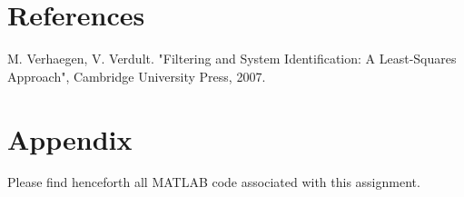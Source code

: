 \documentclass[12pt]{report}
\begin{document}
\newpage
\section*{References}


M. Verhaegen, V. Verdult. "Filtering and System Identification: A Least-Squares Approach", Cambridge University Press, 2007.

\section*{Appendix}
Please find henceforth all MATLAB code associated with this assignment.
\end{document}
